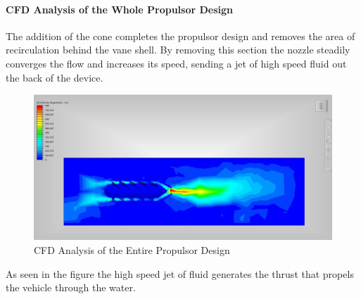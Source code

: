 \documentclass{report}
\begin{document}
\paragraph{CFD Analysis of the Whole Propulsor Design}
The addition of the cone completes the propulsor design and removes the area of recirculation behind the vane shell. By removing this section the nozzle steadily converges the flow and increases its speed, sending a jet of high speed fluid out the back of the device. 
\begin{figure}[H]
\centering
\includegraphics[width=12cm]{CFDvsbnc}
\caption{CFD Analysis of the Entire Propulsor Design} 
\end{figure}
	As seen in the figure the high speed jet of fluid generates the thrust that propels the vehicle through the water.
\end{document}
